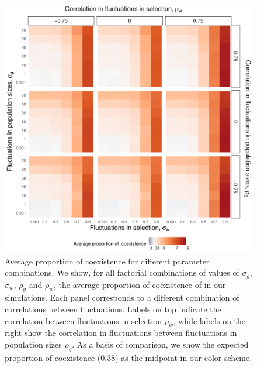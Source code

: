 \documentclass[12pt]{article}
\begin{document}
\begin{figure}[H]
  \centerline{\includegraphics[width=1\textwidth]{heat_map.pdf}}
  \caption{Average proportion of coexistence for different parameter combinations. We show, for all factorial combinations of values of $\sigma_{g}$, $\sigma_{w}$, $\rho_{g}$ and $\rho_{w}$, the average proportion of coexistence of in our simulations. Each panel corresponds to a different combination of correlations between fluctuations. Labels on top indicate the correlation between fluctuations in selection $\rho_{w}$, while labels on the right show the correlation in fluctuations between fluctuations in population sizes $\rho_{g}$.  As a basis of comparison, we show the expected proportion of coexistence ($ 0.38$) as the midpoint in our color scheme.   }
    \label{fig:heatmap}
\end{figure}


\clearpage
\end{document}

